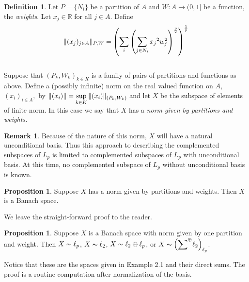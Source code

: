 \documentclass[12pt]{amsart}
\theoremstyle{definition}
\newtheorem{proposition}[theorem]{Proposition}
\newtheorem{remark}[theorem]{Remark}
\newtheorem{definition}[theorem]{Definition}
\theoremstyle{remark}
\numberwithin{equation}{section}
\begin{document}
\begin{definition}\label{norm}
Let $P=\{ N_i\}$ be a partition of $A$ and 
 $ W : A \rightarrow { ( 0, 1 ]}$  be a function, the {\it weights}. 
Let $x_j \in \mathbb{R}$ for all $j\in A$.
Define \\
 $$\begin{displaystyle} \|(x_j)_{j\in A}\|_{P,W} = \left(\sum_{i} \left (
 \sum_{j\in {N_i}} {x_j}^2 w_{j}^{2}\right
 )^{\frac{p}{2}}\right)^{\frac{1}{p}}
 \end{displaystyle}$$\\
Suppose that $(P_k, W_k)_{k\in K}$ is a family of pairs of partitions
 and functions as above. Define a (possibly infinite)
norm on the real valued function on 
$A$, $(x_i)_{i \in A},$ by
 $ \|(x_i)\| = \begin{displaystyle} \sup_{k\in K} \|(x_i)\|_{(P_k,
 W_k)} \end{displaystyle} $ 
and let $X$ be the subspace of elements of finite norm. In this case
we say that $X$ has a {\it norm given by partitions and weights.}
\end{definition}
\begin{remark}
Because of the nature of this norm, $X$ will have a natural
 unconditional basis. Thus this approach to describing the
 complemented subspaces of $L_p$ is limited to complemented
 subspaces of $L_p$ with unconditional basis. At this time,
 no complemented subspace of $L_p$ without unconditional basis is known.
\end{remark}


\begin{proposition}
Suppose $X$ has a norm given by partitions and weights. Then $X$ is a Banach
space.
\end{proposition}
We leave the straight-forward proof to the reader.

\begin{proposition}\label{1-partition} Suppose $X$ is a 
 Banach space with norm
 given by one partition and weight. Then  $X \thicksim \ell_p$,
 $X \thicksim \ell_2$,
$ X \thicksim \ell_2 \oplus \ell_p$, or  $X \thicksim \begin{displaystyle}
 \left ( {{\sum}^{\oplus} \ell_2}\right )_{\ell_p}  \end{displaystyle}$.
\end{proposition}

Notice that these are the spaces given in Example 2.1 and 
their direct sums. 
The proof is a routine computation after normalization of the basis.
\end{document}
